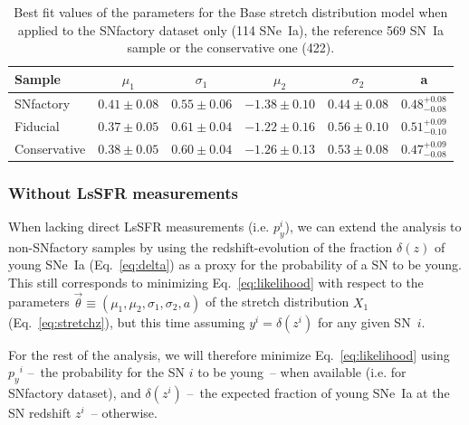\documentclass[]{aa} %
\begin{document}
\begin{table}
    \centering
    \caption{Best fit values of the parameters for the Base stretch distribution
    model when applied to the SNfactory dataset only (114 SNe~Ia), the reference 569
SN~Ia sample or the conservative one (422).}
    \label{tab:modelresults}
    \begin{tabular}{lccccc}
    \hline\hline%
        Sample & $\mu_1$  & $\sigma_1$ &$\mu_2$  & $\sigma_2$ & a \\%
        \hline%
        SNfactory & $0.41 \pm 0.08$  & $0.55 \pm 0.06$ & $-1.38 \pm 0.10$ & $0.44 \pm 0.08$ & $0.48^{+0.08}_{-0.08}$ \\%
        Fiducial & $0.37 \pm 0.05$  & $0.61 \pm 0.04$ & $-1.22 \pm 0.16$ & $0.56 \pm 0.10$ & $0.51^{+0.09}_{-0.10}$ \\%
        Conservative & $0.38 \pm 0.05$  & $0.60 \pm 0.04$ & $-1.26 \pm 0.13$ & $0.53 \pm 0.08$ & $0.47^{+0.09}_{-0.08}$ \\%
        \hline
    \end{tabular}
\end{table}

\subsubsection{Without LsSFR measurements}\label{sec:modelnopy}

When lacking direct LsSFR measurements (i.e. $p_y^i$), we can extend the
analysis to non-SNfactory samples by using the redshift-evolution of the
fraction $\delta(z)$ of young SNe~Ia (Eq.~\ref{eq:delta}) as a proxy for the
probability of a SN to be young. This still corresponds to minimizing
Eq.~\ref{eq:likelihood} with respect to the parameters $\vec{\theta}\equiv(\mu_1,
\mu_2, \sigma_1, \sigma_2, a)$ of the stretch distribution $X_1$
(Eq.~\ref{eq:stretchz}), but this time assuming $y^i = \delta(z^i)$ for any
given SN~$i$. 

For the rest of the analysis, we will therefore minimize Eq.~\ref{eq:likelihood}
using $p_y{}^i$ --~the probability for the SN $i$ to be young~-- when available
(i.e. for SNfactory dataset), and $\delta(z^{i})$ --~the expected fraction of
young SNe~Ia at the SN redshift $z^{i}$~-- otherwise.
\end{document}
